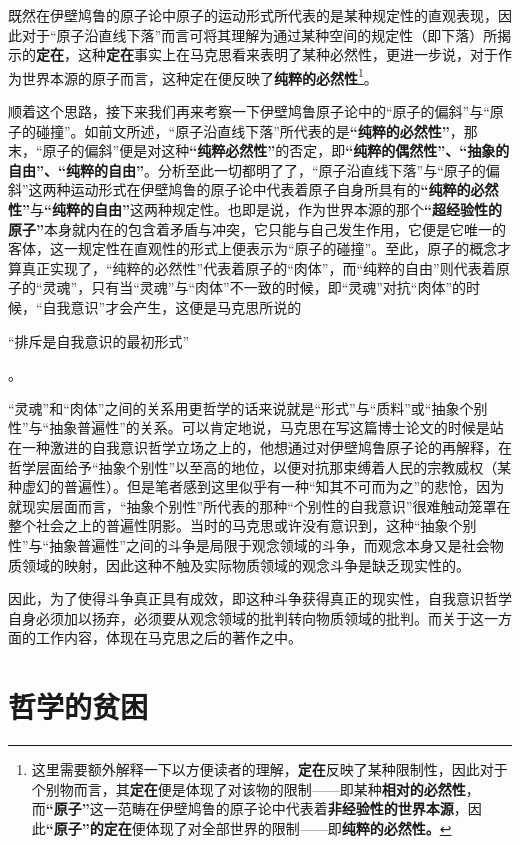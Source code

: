 \documentclass[a4paper,twoside,12pt]{ctexart}
\begin{document}
既然在伊壁鸠鲁的原子论中原子的运动形式所代表的是某种规定性的直观表现，因此对于“原子沿直线下落”而言可将其理解为通过某种空间的规定性（即下落）所揭示的\textbf{定在}，这种\textbf{定在}事实上在马克思看来表明了某种必然性，更进一步说，对于作为世界本源的原子而言，这种定在便反映了\textbf{纯粹的必然性}\footnote{这里需要额外解释一下以方便读者的理解，\textbf{定在}反映了某种限制性，因此对于个别物而言，其\textbf{定在}便是体现了对该物的限制——即某种\textbf{相对的必然性}，而\textbf{“原子”}这一范畴在伊壁鸠鲁的原子论中代表着\textbf{非经验性的世界本源}，因此\textbf{“原子”的定在}便体现了对全部世界的限制——即\textbf{纯粹的必然性。}}。

顺着这个思路，接下来我们再来考察一下伊壁鸠鲁原子论中的“原子的偏斜”与“原子的碰撞”。如前文所述，“原子沿直线下落”所代表的是\textbf{“纯粹的必然性”}，那末，“原子的偏斜”便是对这种\textbf{“纯粹必然性”}的否定，即\textbf{“纯粹的偶然性”、“抽象的自由”、“纯粹的自由”}。分析至此一切都明了了，“原子沿直线下落”与“原子的偏斜”这两种运动形式在伊壁鸠鲁的原子论中代表着原子自身所具有的\textbf{“纯粹的必然性”}与\textbf{“纯粹的自由”}这两种规定性。也即是说，作为世界本源的那个\textbf{“超经验性的原子”}本身就内在的包含着矛盾与冲突，它只能与自己发生作用，它便是它唯一的客体，这一规定性在直观性的形式上便表示为“原子的碰撞”。至此，原子的概念才算真正实现了，“纯粹的必然性”代表着原子的“肉体”，而“纯粹的自由”则代表着原子的“灵魂”，只有当“灵魂”与“肉体”不一致的时候，即“灵魂”对抗“肉体”的时候，“自我意识”才会产生，这便是马克思所说的\begin{fangsong}“排斥是自我意识的最初形式”    \end{fangsong}。

“灵魂”和“肉体”之间的关系用更哲学的话来说就是“形式”与“质料”或“抽象个别性”与“抽象普遍性”的关系。可以肯定地说，马克思在写这篇博士论文的时候是站在一种激进的自我意识哲学立场之上的，他想通过对伊壁鸠鲁原子论的再解释，在哲学层面给予“抽象个别性”以至高的地位，以便对抗那束缚着人民的宗教威权（某种虚幻的普遍性）。但是笔者感到这里似乎有一种“知其不可而为之”的悲怆，因为就现实层面而言，“抽象个别性”所代表的那种“个别性的自我意识”很难触动笼罩在整个社会之上的普遍性阴影。当时的马克思或许没有意识到，这种“抽象个别性”与“抽象普遍性”之间的斗争是局限于观念领域的斗争，而观念本身又是社会物质领域的映射，因此这种不触及实际物质领域的观念斗争是缺乏现实性的。

因此，为了使得斗争真正具有成效，即这种斗争获得真正的现实性，自我意识哲学自身必须加以扬弃，必须要从观念领域的批判转向物质领域的批判。而关于这一方面的工作内容，体现在马克思之后的著作之中。
\newpage
\section{哲学的贫困}
\end{document}
